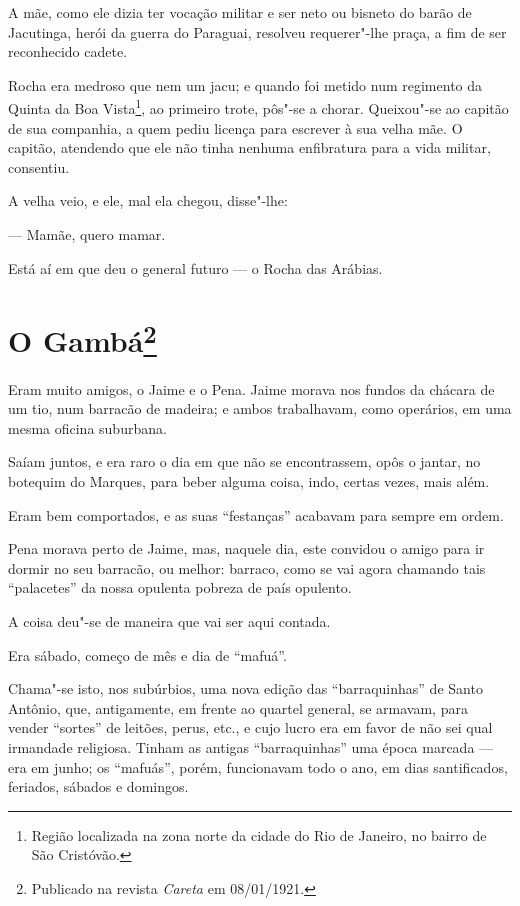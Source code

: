 A mãe, como ele dizia ter vocação militar e ser neto ou bisneto do barão
de Jacutinga, herói da guerra do Paraguai, resolveu requerer"-lhe praça,
a fim de ser reconhecido cadete.

Rocha era medroso que nem um jacu; e quando foi metido num regimento da
Quinta da Boa Vista\footnote{Região localizada na zona norte da cidade
  do Rio de Janeiro, no bairro de São Cristóvão.}, ao primeiro trote,
pôs"-se a chorar. Queixou"-se ao capitão de sua companhia, a quem pediu
licença para escrever à sua velha mãe. O capitão, atendendo que ele não
tinha nenhuma enfibratura para a vida militar, consentiu.

A velha veio, e ele, mal ela chegou, disse"-lhe:

--- Mamãe, quero mamar.

Está aí em que deu o general futuro --- o Rocha das Arábias.



\chapter[O Gambá]{O Gambá\footnote[*]{Publicado na revista \emph{Careta} em 08/01/1921.}}

Eram muito amigos, o Jaime e o Pena. Jaime morava nos fundos da chácara
de um tio, num barracão de madeira; e ambos trabalhavam, como operários,
em uma mesma oficina suburbana.

Saíam juntos, e era raro o dia em que não se encontrassem, opôs o
jantar, no botequim do Marques, para beber alguma coisa, indo, certas
vezes, mais além.

Eram bem comportados, e as suas ``festanças'' acabavam para sempre em
ordem.

Pena morava perto de Jaime, mas, naquele dia, este convidou o amigo para
ir dormir no seu barracão, ou melhor: barraco, como se vai agora
chamando tais ``palacetes'' da nossa opulenta pobreza de país opulento.

A coisa deu"-se de maneira que vai ser aqui contada.

Era sábado, começo de mês e dia de ``mafuá''.

Chama"-se isto, nos subúrbios, uma nova edição das ``barraquinhas'' de
Santo Antônio, que, antigamente, em frente ao quartel general, se
armavam, para vender ``sortes'' de leitões, perus, etc., e cujo lucro
era em favor de não sei qual irmandade religiosa. Tinham as antigas
``barraquinhas'' uma época marcada --- era em junho; os ``mafuás'',
porém, funcionavam todo o ano, em dias santificados, feriados, sábados e
domingos.

